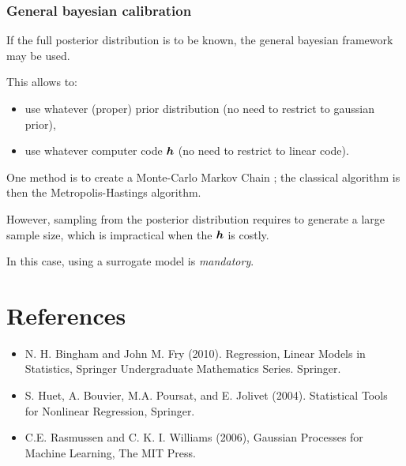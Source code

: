 \documentclass{beamer}
\begin{document}
\begin{frame}
\frametitle{General bayesian calibration}

If the full posterior distribution is to be known, the 
general bayesian framework may be used. 

This allows to:
\begin{itemize}
\item use whatever (proper) prior distribution (no need to restrict to gaussian 
prior),
\item use whatever computer code $\boldsymbol{h}$ (no need to restrict to linear 
code).
\end{itemize}

One method is to create a Monte-Carlo Markov Chain ; the classical algorithm is then the 
Metropolis-Hastings algorithm. 

However, sampling from the posterior distribution 
requires to generate a large sample size, which is impractical 
when the $\boldsymbol{h}$ is costly. 

In this case, using a surrogate model is \emph{mandatory}. 

\end{frame}

\section{References}

\begin{itemize}
\item  N. H. Bingham and John M. Fry (2010). Regression, Linear Models in Statistics, Springer Undergraduate Mathematics Series. Springer.
\item S. Huet, A. Bouvier, M.A. Poursat, and E. Jolivet (2004). Statistical Tools for Nonlinear Regression, Springer.
\item C.E. Rasmussen and C. K. I. Williams (2006), Gaussian Processes for Machine Learning, The MIT Press.
\end{itemize}
\end{document}
